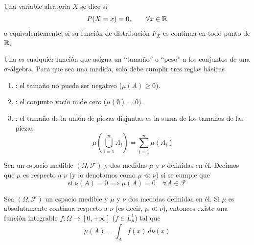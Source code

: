 \begin{definicion}
    Una variable aleatoria $X$ se dice  si 
    \begin{equation*}
        P(X=x)=0, \qquad \forall x\in \mathbb{R}
    \end{equation*}
    o equivalentemente, si su función de distribución $F_X$ es continua en todo punto de $\mathbb{R}$.
\end{definicion}


\begin{definicion}[Misura]
    Una  es cualquier función que asigna un ``tamaño'' o ``peso'' a los conjuntos de una $\sigma$-álgebra. Para que sea una medida, solo debe cumplir tres reglas básicas
    \begin{enumerate}[label=\arabic*)]
        \item {}: el tamaño no puede ser negativo ($\mu(A) \geq 0$).
        \item {}: el conjunto vacío mide cero ($\mu(\emptyset) = 0$).
        \item {}: el tamaño de la unión de piezas disjuntas es la suma de los tamaños de las piezas
        \begin{equation*}
            \mu\left(\bigcup_{i=1}^{\infty} A_i\right) = \sum_{i=1}^{\infty} \mu(A_i)
        \end{equation*}
    \end{enumerate}
\end{definicion}

\begin{definicion}
    Sea un espacio medible $(\Omega, \mathcal{F})$ y dos medidas $\mu$ y $\nu$ definidas en él. Decimos que $\mu$ es  respecto a $\nu$ (y lo denotamos como $\mu \ll \nu$) si se cumple que
    \begin{equation*}
        \text{si } \nu(A)=0  \implies \mu(A)=0 \quad \forall A\in \mathcal{F}
    \end{equation*}
\end{definicion}

\begin{teo}
    Sea $(\Omega, \mathcal{F})$ un espacio medible y $\mu$ y $\nu$ dos medidas definidas en él. Si $\mu$ es absolutamente continua respecto a $\nu$ (es decir, $\mu \ll \nu$), entonces existe una función integrable $f:\Omega \to [0, +\infty]$ ($f\in L_{\mu}^1$) tal que
    \begin{equation*}
        \mu(A) = \int_A f(x) \, d\nu(x)
    \end{equation*}
\end{teo}


